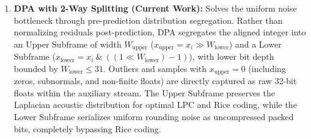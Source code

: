 \documentclass[10pt,twocolumn]{article}
\begin{document}
\begin{enumerate}
	      While shift normalization successfully stripped the trailing zeros from the loud samples, empirical instrumentation revealed that the quotient residuals $Q_i$ formed a rigid, uniform floor of $\approx 17\text{ bits/sample}$ across entire blocks. Normalizing residuals by dividing by the local sample shift mathematically scaled the prediction errors back to the full 24-bit mantissa domain. Because non-power-of-two gain staging fills the lower mantissa of every sample with uniform rounding noise, feeding this uniform distribution into a partitioned Rice coder caused partition-wide parameter inflation, capping DAW compression at $\approx 71.3\%$.

	\item \textbf{DPA with 2-Way Splitting (Current Work):} Solves the uniform noise bottleneck through pre-prediction distribution segregation. Rather than normalizing residuals post-prediction, DPA segregates the aligned integer into an Upper Subframe of width $W_{\text{upper}}$ ($x_{\text{upper}}=x_i\gg W_{\text{lower}}$) and a Lower Subframe ($x_{\text{lower}}=x_i\ \&\ ((1\ll W_{\text{lower}})-1)$), with lower bit depth bounded by $W_{\text{lower}}\le 31$. Outliers and samples with $x_{\text{upper}}=0$ (including zeros, subnormals, and non-finite floats) are directly captured as raw 32-bit floats within the auxiliary stream. The Upper Subframe preserves the Laplacian acoustic distribution for optimal LPC and Rice coding, while the Lower Subframe serializes uniform rounding noise as uncompressed packed bits, completely bypassing Rice coding.


\end{enumerate}
\end{document}
